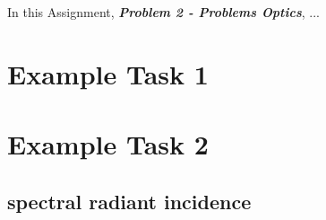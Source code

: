 

In this Assignment, \textit{\textbf{Problem 2 - Problems Optics}}, ...


\section{Example Task 1}



\section{Example Task 2}

\subsection{spectral radiant incidence}

